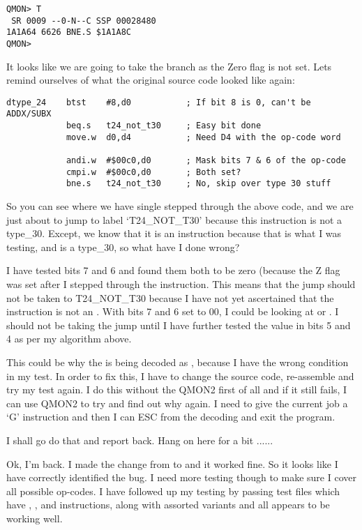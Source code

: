 \begin{appendix}
\begin{lstlisting}[frame=none,numbers=none,]
QMON> T
 SR 0009 --0-N--C SSP 00028480
1A1A64 6626 BNE.S $1A1A8C
QMON>
\end{lstlisting}

It looks like we are going to take the branch as the Zero flag is not set. Lets
remind ourselves of what the original source code looked like again:

\begin{lstlisting}[firstnumber=1,caption={QLTdis Broken Code}]
dtype_24    btst    #8,d0           ; If bit 8 is 0, can't be ADDX/SUBX
            beq.s   t24_not_t30     ; Easy bit done
            move.w  d0,d4           ; Need D4 with the op-code word

            andi.w  #$00c0,d0       ; Mask bits 7 & 6 of the op-code
            cmpi.w  #$00c0,d0       ; Both set?
            bne.s   t24_not_t30     ; No, skip over type 30 stuff
\end{lstlisting}

So you can see where we have single stepped through the above code, and we are
just about to jump to label `T24\_NOT\_T30' because this instruction is not a
type\_30. Except, we know that it is an  instruction because that is what I
was testing, and  is a type\_30, so what have I done wrong?

I have tested bits 7 and 6 and found them both to be zero (because the Z flag
was set after I stepped through the  instruction. This means that
the jump should not be taken to T24\_NOT\_T30 because I have not yet ascertained
that the instruction is not an . With bits 7 and 6 set to 00, I could be
looking at  or . I should not be taking the jump until I have further
tested the value in bits 5 and 4 as per my algorithm above.

This could be why the  is being decoded as , because I have the wrong
condition in my test. In order to fix this, I have to change the source code,
re-{}assemble and try my test again. I do this without the QMON2 first of all and
if it still fails, I can use QMON2 to try and find out why again. I need to give
the current job a `G' instruction and then I can ESC from the decoding and exit
the program.

I shall go do that and report back. Hang on here for a bit ......

Ok, I'm back. I made the change from  to  and it worked fine. So
it looks like I have correctly identified the bug. I need more testing though
to make sure I cover all possible op-{}codes. I have followed up my  testing
by passing test files which have , ,  and  instructions, along
with assorted  variants and all appears to be working well.


\end{appendix}
